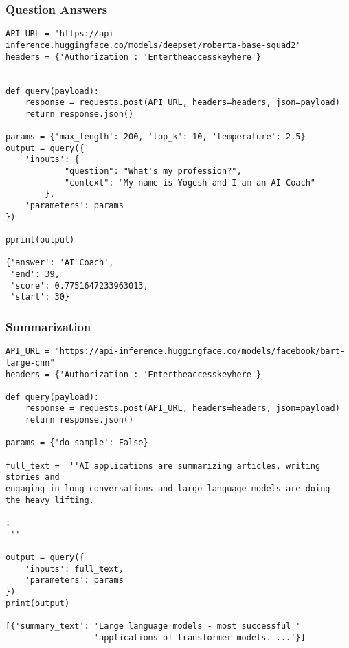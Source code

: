 \begin{frame}[fragile]\frametitle{Question Answers}


\begin{lstlisting}
API_URL = 'https://api-inference.huggingface.co/models/deepset/roberta-base-squad2'
headers = {'Authorization': 'Entertheaccesskeyhere'}


def query(payload):
    response = requests.post(API_URL, headers=headers, json=payload)
    return response.json()
  
params = {'max_length': 200, 'top_k': 10, 'temperature': 2.5}
output = query({
    'inputs': {
            "question": "What's my profession?",
            "context": "My name is Yogesh and I am an AI Coach"
        },
    'parameters': params
})

pprint(output)

{'answer': 'AI Coach',
 'end': 39,
 'score': 0.7751647233963013,
 'start': 30}
\end{lstlisting}


\end{frame}


\begin{frame}[fragile]\frametitle{Summarization}


\begin{lstlisting}
API_URL = "https://api-inference.huggingface.co/models/facebook/bart-large-cnn"
headers = {'Authorization': 'Entertheaccesskeyhere'}

def query(payload):
    response = requests.post(API_URL, headers=headers, json=payload)
    return response.json()
    
params = {'do_sample': False}

full_text = '''AI applications are summarizing articles, writing stories and 
engaging in long conversations and large language models are doing 
the heavy lifting.

:
'''

output = query({
    'inputs': full_text,
    'parameters': params
})
print(output)

[{'summary_text': 'Large language models - most successful '
                  'applications of transformer models. ...'}]
\end{lstlisting}


\end{frame}

